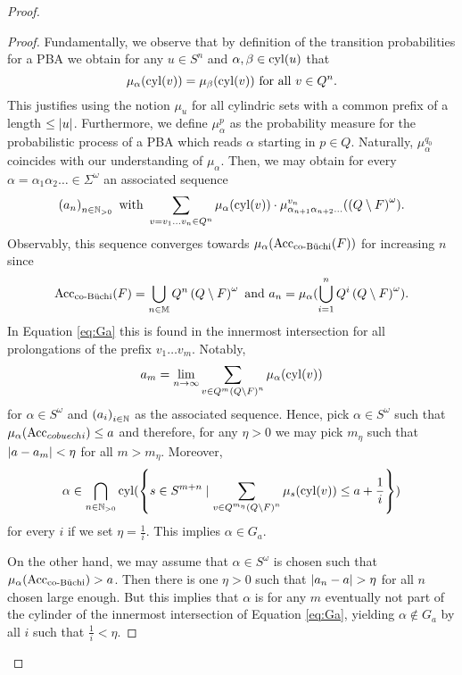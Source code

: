 \begin{proof}
\begin{proof}
    Fundamentally, we observe that by definition of the transition 
    probabilities for a \ac{PBA} we obtain for any $u\in S^{n}$ and 
    $\alpha, \beta\in\operatorname{cyl}(u)$ that
    \begin{equation}
      \mu_{\alpha}(\operatorname{cyl}(v)) = \mu_{\beta}(\operatorname{cyl}(v))\text{ for all }v\in Q^{n}.
    \end{equation}
    This justifies using the notion $\mu_{u}$ for all cylindric sets with a
    common prefix of a length $\leq\left\vert{u}\right\vert$. Furthermore, we define 
    $\mu^{p}_{\alpha}$ as the probability measure for the probabilistic process 
    of a \ac{PBA} which reads $\alpha$ starting in $p\in Q$. Naturally, 
    $\mu^{q_{0}}_{\alpha}$ coincides with our understanding of $\mu_{\alpha}$. 
    Then, we may obtain for every 
    $\alpha = \alpha_{1}\alpha_{2}\dots\in\Sigma^{\omega}$ an associated 
    sequence
    \begin{equation*}
      \left(a_{n}\right)_{n\in\mathbb{N}_{>0}}\text{ with }
      \sum_{v = v_{1}\dots v_{n}\in Q^{n}}\mu_{\alpha}(\operatorname{cyl}(v))\cdot
        \mu^{v_{n}}_{\alpha_{n+1}\alpha_{n+2}\dots}(
          \left(Q\setminus F\right)^{\omega}).
    \end{equation*}
    Observably, this sequence converges towards 
    $\mu_{\alpha}(\operatorname{Acc}_{\operatorname{co-B\ddot{u}chi}}(F))$ for increasing $n$ since
    \begin{equation*}
      \operatorname{Acc}_{\operatorname{co-B\ddot{u}chi}}(F) = \bigcup\limits_{n\in\mathbb{M}}Q^{n}
        \left(Q\setminus F\right)^{\omega}
      \text{ and }a_{n} = \mu_{\alpha}(\bigcup\limits_{i = 1}^{n}
        Q^{i}\left(Q\setminus F\right)^{\omega}).
    \end{equation*}
    In Equation \ref{eq:Ga} this is found in the innermost intersection for all
    prolongations of the prefix $v_{1}\dots v_{m}$. Notably,
    \begin{equation*}
      a_{m} = \lim_{n\rightarrow\infty}\sum
        \limits_{v\in Q^{m}\left(Q\setminus F\right)^{n}}\mu_{\alpha}(\operatorname{cyl}(v))
    \end{equation*}
    for $\alpha\in S^{\omega}$ and $\left(a_{i}\right)_{i\in\mathbb{N}}$ as the 
    associated sequence. Hence, pick $\alpha\in S^{\omega}$ such that 
    $\mu_{\alpha}(\operatorname{Acc}_{cobuechi})\leq a$ and therefore, for any $\eta > 0$ we
    may pick $m_{\eta}$ such that $\left\vert{a - a_{m}}\right\vert < \eta$ for all 
    $m > m_{\eta}$. Moreover,
    \begin{equation*}
      \alpha\in\bigcap_{n\in\mathbb{N}_{>0}}\operatorname{cyl}(\left\{s\in S^{m+n}\mid
        \sum\limits_{v\in Q^{m_{\eta}}\left(Q\setminus F\right)^{n}}\mu_{s}(
        \operatorname{cyl}(v))\leq a+\frac{1}{i}\right\})
    \end{equation*}
    for every $i$ if we set $\eta = \frac{1}{i}$. This implies 
    $\alpha\in G_{a}$.

    On the other hand, we may assume that $\alpha\in S^{\omega}$ is chosen such
    that $\mu_{\alpha}(\operatorname{Acc}_{\operatorname{co-B\ddot{u}chi}}) > a$. Then there is one $\eta > 0$
    such that $\left\vert{a_{n} - a}\right\vert > \eta$ for all $n$ chosen large enough. But 
    this implies that $\alpha$ is for any $m$ eventually not part of the 
    cylinder of the innermost intersection of Equation \ref{eq:Ga}, yielding 
    $\alpha\not\in G_{a}$ by all $i$ such that $\frac{1}{i} < \eta$.
  \end{proof}
\end{proof}
